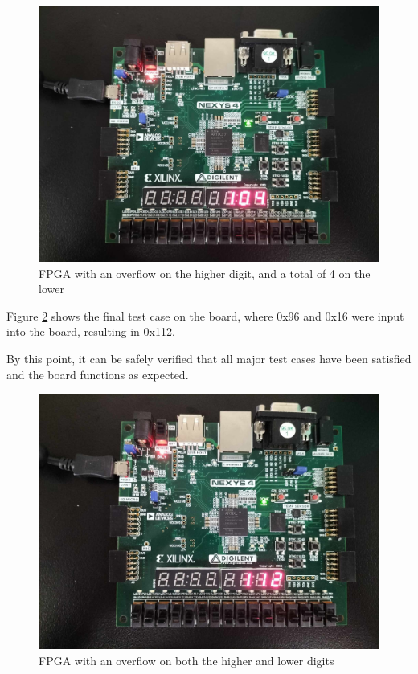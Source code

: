 \documentclass[12pt,a4paper]{article}
\begin{document}
\begin{figure}[H]
    \centering
    \includegraphics[scale=0.1]{images/fpga_1_overflow.jpg}
    \caption{FPGA with an overflow on the higher digit, and a total of 4 on the lower}
    \label{fig:fpga_one}
\end{figure}

Figure \ref{fig:fpga_two} shows the final test case on the board, where 0x96 and 0x16 were input into the board, resulting in 0x112.

By this point, it can be safely verified that all major test cases have been satisfied and the board functions as expected.

\begin{figure}[H]
    \centering
    \includegraphics[scale=0.1]{images/fpga_two_overflow.jpg}
    \caption{FPGA with an overflow on both the higher and lower digits}
    \label{fig:fpga_two}
\end{figure}
\end{document}
